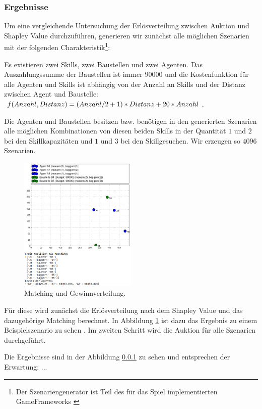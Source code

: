 \subsubsection{Ergebnisse}
Um eine vergleichende Untersuchung der Er\-lös\-ver\-tei\-lung zwischen Auktion und Shapley Value durchzuführen, generieren wir zunächst alle möglichen Szenarien mit der folgenden Charakteristik\footnote{Der Szenariengenerator ist Teil des für das Spiel implementierten GameFrameworks \cite{gitGame}}:

 Es existieren zwei Skills, zwei Baustellen und zwei Agenten. Das Auszahlungssumme der Baustellen ist immer $90000$ und die Kostenfunktion für alle Agenten und Skills ist abhängig von der Anzahl an Skills und der Distanz zwischen Agent und Baustelle: $f(Anzahl, \-Distanz)\- = (Anzahl/2+1)\-*Distanz\-+20*Anzahl$.

Die Agenten und Baustellen besitzen bzw. benötigen in den generierten Szenarien alle möglichen Kombinationen von diesen beiden Skills in der Quantität $1$ und $2$ bei den Skillkapazitäten und $1$ und $3$ bei den Skillgesuchen. Wir erzeugen so $4096$ Szenarien. 

\begin{figure}
  \centering
  \includegraphics[width=0.5\textwidth]{example-shapley-value.png}
  \caption{Matching und Gewinnverteilung.}
  \label{example-shapley-value}
\end{figure}

Für diese wird zunächst die Erlösverteilung nach dem Shapley Value und das dazugehörige Matching berechnet. In Abbildung \ref{example-shapley-value} ist dazu das Ergebnis zu einem Beispielszenario zu sehen \cite{gitShapley}. Im zweiten Schritt wird die Auktion für alle Szenarien durchgeführt.


Die Ergebnisse sind in der Abbildung \ref{} zu sehen und entsprechen der Erwartung: ...

